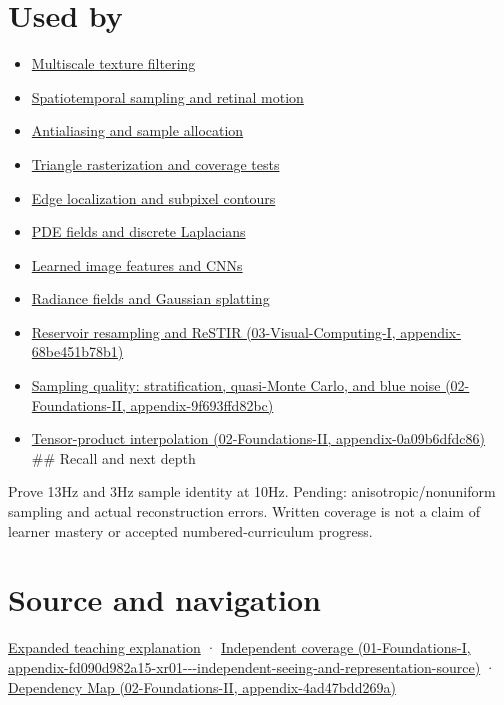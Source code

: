 \section{Used by}\label{appendix-6a7869dd79a6-used-by}

\begin{itemize}
\item
  \hyperref[appendix-b677a85ba76f]{Multiscale texture filtering}
\item
  \hyperref[appendix-70895739febb]{Spatiotemporal sampling and retinal motion}
\item
  \hyperref[appendix-4192b2bdd21e]{Antialiasing and sample allocation}
\item
  \hyperref[appendix-ed3f9bc298fe]{Triangle rasterization and coverage tests}
\item
  \hyperref[appendix-36022286b03e]{Edge localization and subpixel contours}
\item
  \hyperref[appendix-1988d465c119]{PDE fields and discrete Laplacians}
\item
  \hyperref[appendix-47c51ea026fb]{Learned image features and CNNs}
\item
  \hyperref[appendix-c5b332e400e7]{Radiance fields and Gaussian splatting}
\item
  \href{../03-Visual-Computing-I/main.pdf\#nameddest=appendix-68be451b78b1}{Reservoir resampling and ReSTIR (03-Visual-Computing-I, appendix-68be451b78b1)}
\item
  \href{../02-Foundations-II/main.pdf\#nameddest=appendix-9f693ffd82bc}{Sampling quality: stratification, quasi-Monte Carlo, and blue noise (02-Foundations-II, appendix-9f693ffd82bc)}
\item
  \href{../02-Foundations-II/main.pdf\#nameddest=appendix-0a09b6dfdc86}{Tensor-product interpolation (02-Foundations-II, appendix-0a09b6dfdc86)} \#\# Recall and next depth
\end{itemize}

Prove 13Hz and 3Hz sample identity at 10Hz. Pending: anisotropic/nonuniform sampling and actual reconstruction errors. Written coverage is not a claim of learner mastery or accepted numbered-curriculum progress.

\section{Source and navigation}\label{appendix-6a7869dd79a6-source-and-navigation}

\href{Continuous\%20Notes/University\%20-\%20Worlds,\%20Images\%20and\%20Inference\%20-\%20Graphics,\%20Vision\%20and\%20Photography\#Sampling\%20is\%20a\%20question\%20of\%20what\%20remains\%20distinguishable}{Expanded teaching explanation} · \href{../01-Foundations-I/main.pdf\#nameddest=appendix-fd090d982a15-xr01---independent-seeing-and-representation-source}{Independent coverage (01-Foundations-I, appendix-fd090d982a15-xr01-\/-\/-independent-seeing-and-representation-source)} · \href{../02-Foundations-II/main.pdf\#nameddest=appendix-4ad47bdd269a}{Dependency Map (02-Foundations-II, appendix-4ad47bdd269a)}

